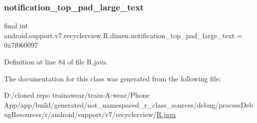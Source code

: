 \subsubsection{\texorpdfstring{notification\_top\_pad\_large\_text}{notification\_top\_pad\_large\_text}}
{\footnotesize\ttfamily final int android.\+support.\+v7.\+recyclerview.\+R.\+dimen.\+notification\+\_\+top\+\_\+pad\+\_\+large\+\_\+text = 0x7f060097\hspace{0.3cm}{\ttfamily [static]}}



Definition at line 84 of file R.\+java.



The documentation for this class was generated from the following file\+:\begin{DoxyCompactItemize}
\item 
D\+:/cloned repo trainawear/train-\/\+A-\/wear/\+Phone App/app/build/generated/not\+\_\+namespaced\+\_\+r\+\_\+class\+\_\+sources/debug/process\+Debug\+Resources/r/android/support/v7/recyclerview/\mbox{\hyperlink{process_debug_resources_2r_2android_2support_2v7_2recyclerview_2_r_8java}{R.\+java}}\end{DoxyCompactItemize}
